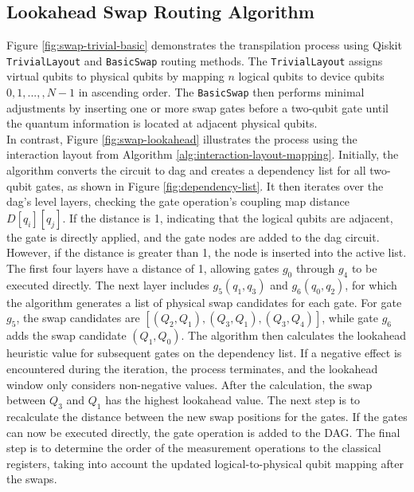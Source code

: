 \subsection{Lookahead Swap Routing Algorithm}
Figure \ref{fig:swap-trivial-basic} demonstrates the transpilation process using Qiskit \lstinline{TrivialLayout} \cite{ibmquantum_triviallayout} and \lstinline{BasicSwap} \cite{ibmquantum_basicswap} routing methods. The \lstinline{TrivialLayout} assigns virtual qubits to physical qubits by mapping $n$ logical qubits to device qubits $0, 1, ...,, N-1$ in ascending order. The \lstinline{BasicSwap} then performs minimal adjustments by inserting one or more swap gates before a two-qubit gate until the quantum information is located at adjacent physical qubits. \\
In contrast, Figure \ref{fig:swap-lookahead} illustrates the process using the interaction layout from Algorithm \ref{alg:interaction-layout-mapping}. Initially, the algorithm converts the circuit to \acrshort{dag} and creates a dependency list for all two-qubit gates, as shown in Figure \ref{fig:dependency-list}. It then iterates over the \acrshort{dag}'s level layers, checking the gate operation's coupling map distance $D[q_i][q_j]$. If the distance is 1, indicating that the logical qubits are adjacent, the gate is directly applied, and the gate nodes are added to the \acrshort{dag} circuit. However, if the distance is greater than 1, the node is inserted into the active list. \\
The first four layers have a distance of 1, allowing gates $g_0$ through $g_4$ to be executed directly. The next layer includes $g_5 (q_1, q_3)$ and $g_6 (q_0, q_2)$, for which the algorithm generates a list of physical swap candidates for each gate. For gate $g_5$, the swap candidates are $[(Q_2, Q_1), (Q_3, Q_1), (Q_3, Q_4)]$, while gate $g_6$ adds the swap candidate $(Q_1, Q_0)$. The algorithm then calculates the lookahead heuristic value for subsequent gates on the dependency list. If a negative effect is encountered during the iteration, the process terminates, and the lookahead window only considers non-negative values. After the calculation, the swap between $Q_3$ and $Q_1$ has the highest lookahead value. The next step is to recalculate the distance between the new swap positions for the gates. If the gates can now be executed directly, the gate operation is added to the DAG. The final step is to determine the order of the measurement operations to the classical registers, taking into account the updated logical-to-physical qubit mapping after the swaps.

